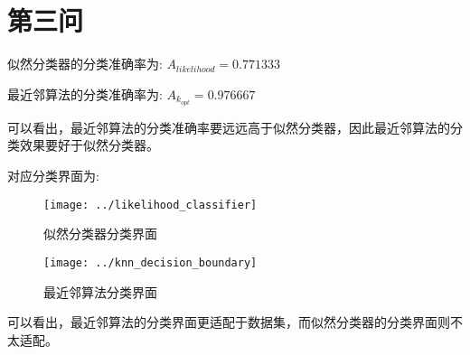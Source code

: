 \documentclass[UTF8]{article} %
\begin{document}
    \section{第三问}

    似然分类器的分类准确率为: $A_{likelihood} = 0.771333$

    最近邻算法的分类准确率为: $A_{k_{opt}} = 0.976667$

    可以看出，最近邻算法的分类准确率要远远高于似然分类器，因此最近邻算法的分类效果要好于似然分类器。

    对应分类界面为:

    \begin{figure}[htbp]
        \begin{minipage}[t]{0.5\linewidth}
            \centering
            \texttt{[image: ../likelihood\_classifier]}
            \caption{似然分类器分类界面}
        \end{minipage}%
        \begin{minipage}[t]{0.5\linewidth}
            \centering
            \texttt{[image: ../knn\_decision\_boundary]}
            \caption{最近邻算法分类界面}
        \end{minipage}
    \end{figure}

    可以看出，最近邻算法的分类界面更适配于数据集，而似然分类器的分类界面则不太适配。
\end{document}
